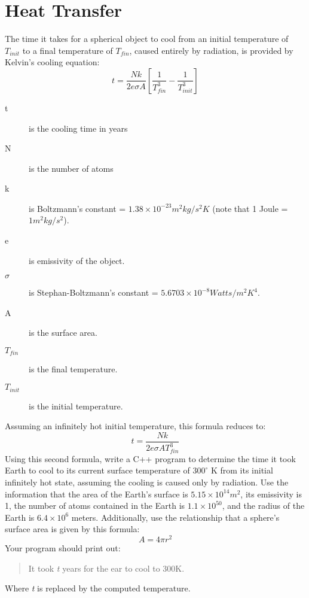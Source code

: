 \documentclass{article}
\begin{document}
\section*{Heat Transfer}
The time it takes for a spherical object to cool from an initial temperature of $T_{init}$ to a final temperature of $T_{fin}$, caused entirely by radiation, is provided by Kelvin’s cooling equation:
\begin{equation}
	t = \frac{Nk}{2e\sigma A}\left[ \frac{1}{T_{fin}^{3}} - \frac{1}{T_{init}^{3}}\right ]
\end{equation}
	\begin{description}
		\item[t] is the cooling time in years
		\item[N] is the number of atoms
		\item[k] is Boltzmann’s constant = $1.38 \times 10^{-23} m^{2}kg/s^{2}K$ (note that 1 Joule = $1 m^{2}kg/s^{2}$).
		\item[e] is emissivity of the object.
		\item[$\sigma$] is Stephan-Boltzmann’s constant = $5.6703 × 10^{-8} Watts/m^{2}K^{4}$.
		\item[A] is the surface area.
		\item[$T_{fin}$] is the final temperature.
		\item[$T_{init}$] is the initial temperature.
	\end{description}
Assuming an infinitely hot initial temperature, this formula reduces to:
	\begin{equation}
		t = \frac{Nk}{2e\sigma A T_{fin}^{3}}
	\end{equation}
Using this second formula, write a C++ program to determine the time it took Earth to cool to its current surface temperature of $300^{\circ}$ K from its initial infinitely hot state, assuming the cooling is caused only by radiation. Use the information that the area of the Earth’s surface is $5.15 \times 10^{14}m^{2}$, its emissivity is 1, the number of atoms contained in the Earth is $1.1 \times 10^{50}$, and the radius of the Earth is $6.4 \times 10^{6}$ meters. Additionally, use the relationship that a sphere’s surface area is given by this formula:
\begin{equation}
	A = 4 \pi r^{2}
\end{equation}
Your program should print out: 
	\begin{quote}
		It took \textit{t} years for the ear to cool to 300K.  
	\end{quote}
Where \textit{t} is replaced by the computed temperature.
\end{document}

